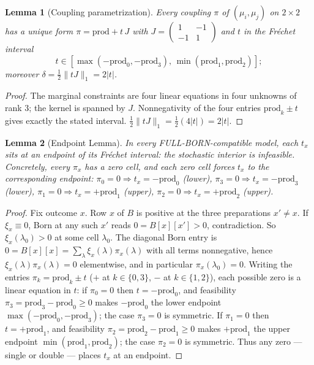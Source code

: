 \documentclass[11pt,a4paper]{article}
\newtheorem{lemma}{Lemma}
\newcommand{\dd}{\delta}
\begin{document}
\begin{lemma}[Coupling parametrization]
\label{lem:reduce}
Every coupling $\pi$ of $(\mu_i,\mu_j)$ on $2\times2$ has a unique form $\pi=\mathrm{prod}+t\,J$ with $J=\left(\begin{smallmatrix}1&-1\\-1&1\end{smallmatrix}\right)$ and $t$ in the Fr\'echet interval
\[ t\in[\max(-\mathrm{prod}_0,-\mathrm{prod}_3),\,\min(\mathrm{prod}_1,\mathrm{prod}_2)]; \] moreover $\dd=\tfrac12\|tJ\|_1=2|t|$.
\end{lemma}
\begin{proof}
The marginal constraints are four linear equations in four unknowns of rank $3$; the kernel is spanned by $J$. Nonnegativity of the four entries $\mathrm{prod}_k\pm t$ gives exactly the stated interval. $\tfrac12\|tJ\|_1=\tfrac12(4|t|)=2|t|$.
\end{proof}

\begin{lemma}[Endpoint Lemma]
\label{lem:endpoint}
In every FULL-BORN-compatible model, each $t_x$ sits at an endpoint of its Fr\'echet interval: the stochastic interior is infeasible. Concretely, every $\pi_x$ has a zero cell, and each zero cell forces $t_x$ to the corresponding endpoint:
$\pi_0=0\Rightarrow t_x=-\mathrm{prod}_0$ (lower), $\pi_3=0\Rightarrow t_x=-\mathrm{prod}_3$ (lower), $\pi_1=0\Rightarrow t_x=+\mathrm{prod}_1$ (upper), $\pi_2=0\Rightarrow t_x=+\mathrm{prod}_2$ (upper).
\end{lemma}
\begin{proof}
Fix outcome $x$. Row $x$ of $B$ is positive at the three preparations $x'\ne x$. If $\xi_x\equiv 0$, Born at any such $x'$ reads $0=B[x][x']>0$, contradiction. So $\xi_x(\lambda_0)>0$ at some cell $\lambda_0$. The diagonal Born entry is $0=B[x][x]=\sum_\lambda \xi_x(\lambda)\pi_x(\lambda)$ with all terms nonnegative, hence $\xi_x(\lambda)\pi_x(\lambda)=0$ elementwise, and in particular $\pi_x(\lambda_0)=0$. Writing the entries $\pi_k=\mathrm{prod}_k\pm t$ ($+$ at $k\in\{0,3\}$, $-$ at $k\in\{1,2\}$), each possible zero is a linear equation in $t$:
if $\pi_0=0$ then $t=-\mathrm{prod}_0$, and feasibility $\pi_3=\mathrm{prod}_3-\mathrm{prod}_0\ge0$ makes $-\mathrm{prod}_0$ the lower endpoint $\max(-\mathrm{prod}_0,-\mathrm{prod}_3)$; the case $\pi_3=0$ is symmetric. If $\pi_1=0$ then $t=+\mathrm{prod}_1$, and feasibility $\pi_2=\mathrm{prod}_2-\mathrm{prod}_1\ge0$ makes $+\mathrm{prod}_1$ the upper endpoint $\min(\mathrm{prod}_1,\mathrm{prod}_2)$; the case $\pi_2=0$ is symmetric. Thus any zero --- single or double --- places $t_x$ at an endpoint.
\end{proof}
\end{document}
